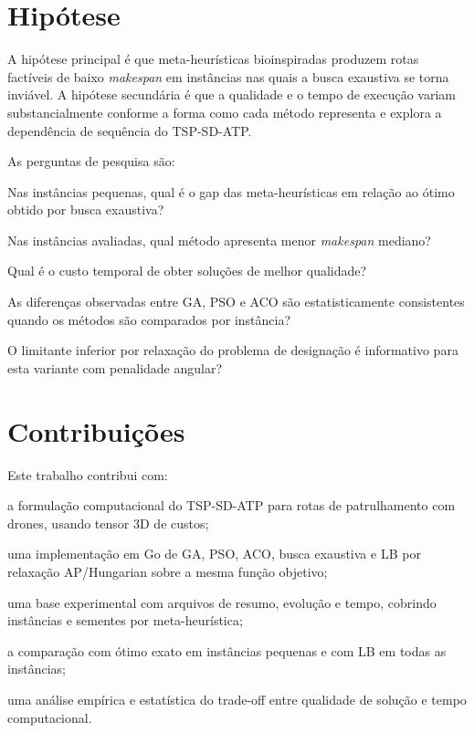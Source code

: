 \section{Hipótese}

A hipótese principal é que meta-heurísticas bioinspiradas produzem rotas factíveis de baixo \textit{makespan} em instâncias nas quais a busca exaustiva se torna inviável. A hipótese secundária é que a qualidade e o tempo de execução variam substancialmente conforme a forma como cada método representa e explora a dependência de sequência do \ac{TSP-SD-ATP}.

As perguntas de pesquisa são:
\begin{alineas}
  \item Nas instâncias pequenas, qual é o gap das meta-heurísticas em relação ao ótimo obtido por busca exaustiva?
  \item Nas \TotalInstancias{} instâncias avaliadas, qual método apresenta menor \textit{makespan} mediano?
  \item Qual é o custo temporal de obter soluções de melhor qualidade?
  \item As diferenças observadas entre \ac{GA}, \ac{PSO} e \ac{ACO} são estatisticamente consistentes quando os métodos são comparados por instância?
  \item O limitante inferior por relaxação do problema de designação é informativo para esta variante com penalidade angular?
\end{alineas}

\section{Contribuições}

Este trabalho contribui com:
\begin{alineas}
  \item a formulação computacional do \ac{TSP-SD-ATP} para rotas de patrulhamento com drones, usando tensor 3D de custos;
  \item uma implementação em Go de \ac{GA}, \ac{PSO}, \ac{ACO}, busca exaustiva e \ac{LB} por relaxação \ac{AP}/Hungarian sobre a mesma função objetivo;
  \item uma base experimental com \TotalExecucoes{} arquivos de resumo, evolução e tempo, cobrindo \TotalInstancias{} instâncias e \TotalSementesGA{} sementes por meta-heurística;
  \item a comparação com ótimo exato em \TotalInstanciasComOtimo{} instâncias pequenas e com \ac{LB} em todas as \TotalInstancias{} instâncias;
  \item uma análise empírica e estatística do trade-off entre qualidade de solução e tempo computacional.
\end{alineas}

